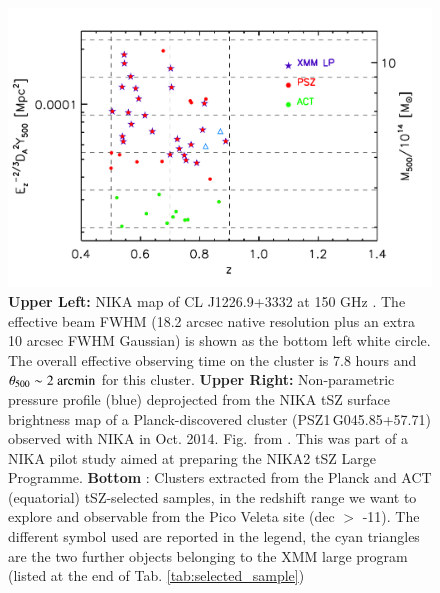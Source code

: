 \documentclass[11pt,a4paper,twoside,graphicx,color]{article}
\begin{document}
\begin{figure}[t]
\includegraphics[scale=0.45]{./Figures/NIKA2_sample}   
\caption{{\small {\bf Upper Left:} NIKA map of CL J1226.9+3332 at 150 GHz \cite{Adam2015}. The effective beam FWHM (18.2 arcsec native resolution plus an extra 10 arcsec FWHM Gaussian) is shown as 
the bottom left white circle.  The overall effective observing time on the cluster is 7.8 hours and $\theta_{500} \sim 2~\rm{arcmin}$ for this cluster. 
{\bf Upper Right:} 
Non-parametric pressure profile (blue) deprojected from the 
NIKA tSZ surface brightness map of a Planck-discovered cluster 
(PSZ1\,G045.85+57.71) observed with NIKA in Oct. 2014. Fig.~from \cite{Ruppin2016}.
This   was part of a NIKA pilot study aimed 
at preparing the NIKA2 tSZ Large Programme. {\bf Bottom} : Clusters extracted from the Planck and ACT (equatorial) tSZ-selected samples, in the redshift range we want to explore 
and observable from the Pico Veleta site (dec $>$ -11). The different symbol used are reported in the legend, 
the cyan triangles are the two further objects belonging to the XMM large program (listed at the end of 
Tab. \ref{tab:selected_sample})}}
\label{Fig:CL_and_PSZ1}
\end{figure}



 

\end{document}
